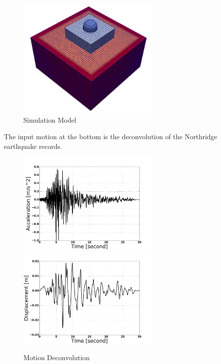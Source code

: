 \begin{figure}[H]
  \centering
  \includegraphics[width = 7cm]{./Figure-files/Day1/Nuclear_Power_Plant_with_1D_motions_from_Deconvolution/overview.png}
  \caption{Simulation Model}
  \label{fig_NPP_3D_overview_1D_motion}
\end{figure}

The input motion at the bottom is the deconvolution of the Northridge earthquake records. 

\begin{figure}[H]
  \centering
  \includegraphics[width = 7cm]{./Figure-files/Day1/Nuclear_Power_Plant_with_1D_motions_from_Deconvolution/scaled_NORTHR_x_A.jpg}
  \includegraphics[width = 7cm]{./Figure-files/Day1/Nuclear_Power_Plant_with_1D_motions_from_Deconvolution/scaled_NORTHR_x_D.jpg}
  \caption{Motion Deconvolution}
  \label{fig_motion_deconvolution1}
\end{figure}

